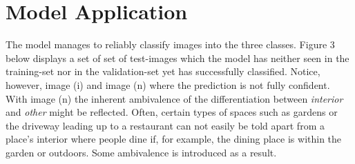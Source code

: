 \documentclass[11pt, oneside]{article}   	%
\begin{document}
\section{Model Application}
The model manages to reliably classify images into the three classes. Figure 3 below displays a set of set of test-images which the model has neither seen in the training-set nor in the validation-set yet has successfully classified. Notice, however, image (i) and image (n) where the prediction is not fully confident. With image (n) the inherent ambivalence of the differentiation between \textit{interior} and \textit{other} might be reflected. Often, certain types of spaces such as gardens or the driveway leading up to a restaurant can not easily be told apart from a place's interior where people dine if, for example, the dining place is within the garden or outdoors. Some ambivalence is introduced as a result.
\end{document}
